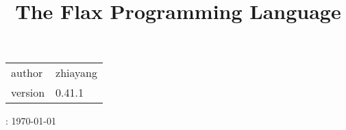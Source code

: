 \documentclass[11pt]{article}
\title{The Flax Programming Language}
\begin{document}

\fancyhf[C]{}

\hypersetup{pageanchor=false}

\begin{center}

	\vspace*{5mm}

	\begin{flushleft}\begin{spacing}{3.5}
	\end{spacing}\end{flushleft}

	\vspace*{30mm}

	\texttt{\Huge <insert logo here>}
	\vfill

	\vspace*{30mm}

	\linespread{1.0}
	\begin{flushleft}\begin{table}[htb]\renewcommand{\arraystretch}{1.1}\fontsize{14pt}{20pt}\selectfont
	\begin{tabu} to 0.8\textwidth { X[l,m] X[2,l,m] }
		author  & zhiayang   \\
		version & 0.41.1
	\end{tabu}\end{table}\end{flushleft}

	\vfill
	{
		\large
		: \today  \\[0.6em]
		\normalsize
	}
	\vspace*{20mm}

\end{center}


\fancyhead{}
\afterpage{\blankpage}

\pagebreak

\fancyfoot{}
\fancyfoot[C]{\thepage}

\hypersetup{pageanchor=true}

\tableofcontents
\pagebreak




% 
% 
% 
\end{document}
